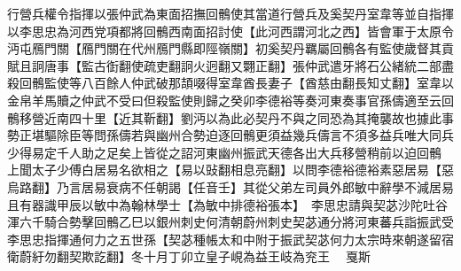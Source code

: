 行營兵權令指揮以張仲武為東面招撫回鶻使其當道行營兵及奚契丹室韋等並自指揮以李思忠為河西党項都將回鶻西南面招討使【此河西謂河北之西】皆會軍于太原令沔屯鴈門關【鴈門關在代州鴈門縣即陘嶺關】初奚契丹羈屬回鶻各有監使歲督其貢賦且詗唐事【監古衘翻使疏吏翻詗火迥翻又翾正翻】張仲武遣牙將石公緒統二部盡殺回鶻監使等八百餘人仲武破那頡啜得室韋酋長妻子【酋慈由翻長知丈翻】室韋以金帛羊馬贖之仲武不受曰但殺監使則歸之癸卯李德裕等奏河東奏事官孫儔適至云回鶻移營近南四十里【近其靳翻】劉沔以為此必契丹不與之同恐為其掩襲故也據此事勢正堪驅除臣等問孫儔若與幽州合勢迫逐回鶻更須益幾兵儔言不須多益兵唯大同兵少得易定千人助之足矣上皆從之詔河東幽州振武天德各出大兵移營稍前以迫回鶻　上聞太子少傅白居易名欲相之【易以䜴翻相息亮翻】以問李德裕德裕素惡居易【惡烏路翻】乃言居易衰病不任朝謁【任音壬】其從父弟左司員外郎敏中辭學不減居易且有器識甲辰以敏中為翰林學士【為敏中排德裕張本】　李思忠請與契苾沙陀吐谷渾六千騎合勢擊回鶻乙巳以銀州刺史何清朝蔚州刺史契苾通分將河東蕃兵詣振武受李思忠指揮通何力之五世孫【契苾種帳太和中附于振武契苾何力太宗時來朝遂留宿衛蔚紆勿翻契欺訖翻】冬十月丁卯立皇子峴為益王岐為兖王　戛斯

